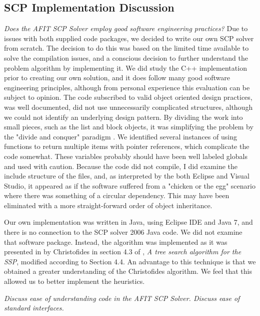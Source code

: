 \documentclass[12pt]{article}
\begin{document}
	\subsection{SCP Implementation Discussion}
	\textit{Does the AFIT SCP Solver employ good software engineering practices?}
	Due to issues with both supplied code packages, we decided to write our own SCP solver from scratch. The decision to do this was based on the limited time available to solve the compilation issues, and a conscious decision to further understand the problem algorithm by implementing it. We did study the C++ implementation prior to creating our own solution, and it does follow many good software engineering principles, although from personal experience this evaluation can be subject to opinion. The code subscribed to valid object oriented design practices, was well documented, did not use unnecessarily complicated structures, although we could not identify an underlying design pattern. By dividing the work into small pieces, such as the list and block objects, it was simplifying the problem by the "divide and conquer" paradigm \cite{software}. We identified several instances of using functions to return multiple items with pointer references, which complicate the code somewhat. These variables probably should have been well labeled globals and used with caution. Because the code did not compile, I did examine the include structure of the files, and, as interpreted by the both Eclipse and Visual Studio, it appeared as if the software suffered from a "chicken or the egg" scenario where there was something of a circular dependency. This may have been eliminated with a more straight-forward order of object inheritance.
	
	Our own implementation was written in Java, using Eclipse IDE and Java 7, and there is no connection to the SCP solver 2006 Java code. We did not examine that software package. Instead, the algorithm was implemented as it was presented in by Christofides in section 4.3 of \cite{graph_algorithms_cristofides}, \textit{A tree search algorithm for the SSP}, modified according to Section 4.4. An advantage to this technique is that we obtained a greater understanding of the Christofides algorithm. We feel that this allowed us to better implement the heuristics.
	
	\textit{Discuss ease of understanding code in the AFIT SCP Solver. Discuss ease of standard interfaces.}
	
\end{document}
